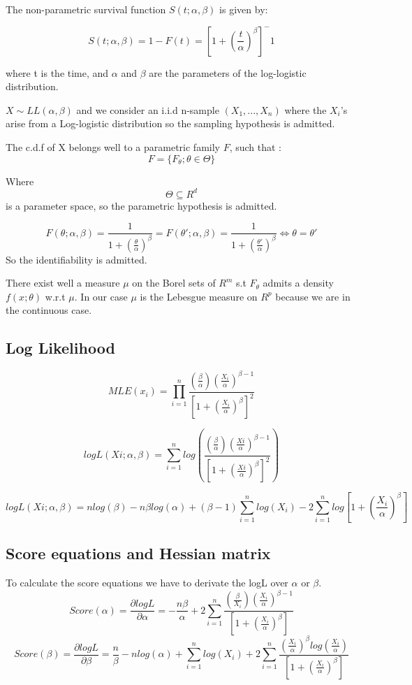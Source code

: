 \documentclass[
]{article}
\begin{document}
The non-parametric survival function \(S(t; \alpha,\beta)\) is given by:

\[S(t; \alpha,\beta) = 1-F(t) = [1 + (\frac{t}{\alpha})^\beta]^-1\]

where t is the time, and \(\alpha\) and \(\beta\) are the parameters of
the log-logistic distribution.

\(X \sim LL(\alpha , \beta)\) and we consider an i.i.d n-sample
\((X_1,...,X_n)\) where the \(X_i\)'s arise from a Log-logistic
distribution so the sampling hypothesis is admitted.

The c.d.f of X belongs well to a parametric family \(F\), such that :
\[F = \{ F_\theta;\theta \in \Theta \}\]

Where \[\Theta \subseteq R^d\] is a parameter space, so the parametric
hypothesis is admitted.

\[F(\theta; \alpha,\beta) = \frac{1}{1 +(\frac{\theta}{\alpha})^\beta} =  F(\theta'; \alpha,\beta) = \frac{1}{1 +(\frac{\theta'}{\alpha})^\beta} \iff \theta = \theta' \]
So the identifiability is admitted.

There exist well a measure \(\mu\) on the Borel sets of \(R^m\) s.t
\(F_\theta\) admits a density \(f(x;\theta)\) w.r.t \(\mu\). In our case
\(\mu\) is the Lebesgue measure on \(R^p\) because we are in the
continuous case.

\hypertarget{log-likelihood}{%
\subsection{Log Likelihood}\label{log-likelihood}}

\[MLE(x_i) = \prod_{i=1}^{n}  \frac{(\frac{\beta}{\alpha})(\frac{X_i}{\alpha})^{\beta-1}}{[1+(\frac{X_i}{\alpha})^\beta]^2} \]

\[log L(Xi; \alpha, \beta) = \sum_{i=1}^{n}  log \left(\frac{(\frac{\beta}{\alpha})(\frac{Xi}{\alpha})^{\beta-1}}{[1+(\frac{Xi}{\alpha})^\beta]^2}\right)\]

\[log L(Xi; \alpha, \beta) = n log(\beta) - n\beta log(\alpha) + (\beta-1)\sum_{i=1}^{n} log(X_i) -2\sum_{i=1}^{n} log[1 + (\frac{X_i}{\alpha})^\beta] \]

\hypertarget{score-equations-and-hessian-matrix}{%
\subsection{Score equations and Hessian
matrix}\label{score-equations-and-hessian-matrix}}

To calculate the score equations we have to derivate the logL over
\(\alpha\) or \(\beta\).
\[Score(\alpha) = \frac{\partial log L}{\partial \alpha} = -\frac{n\beta}{\alpha} + 2\sum_{i=1}^{n} \frac{(\frac{\beta}{X_i})(\frac{X_i}{\alpha})^{\beta - 1}}{[1 + (\frac{X_i}{\alpha})^\beta]}  \]
\[Score(\beta) = \frac{\partial log L}{\partial \beta} = \frac{n}{\beta} - nlog(\alpha) + \sum_{i=1}^{n} log(X_i) + 2\sum_{i=1}^{n} \frac{(\frac{X_i}{\alpha})^\beta log(\frac{X_i}{\alpha})}{[1 + (\frac{X_i}{\alpha})^\beta]}   \]
\end{document}

